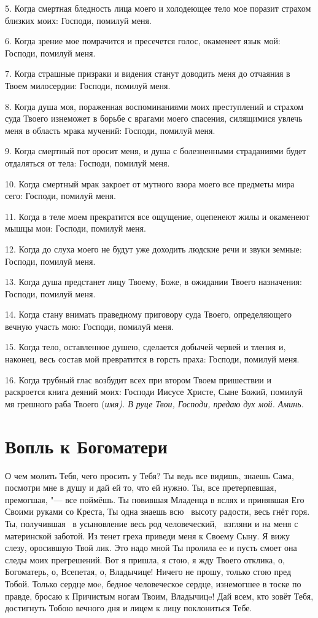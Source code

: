 5. Когда смертная бледность лица моего и холодеющее тело мое поразит страхом близких моих: Господи, помилуй меня. 

6. Когда зрение мое помрачится и пресечется голос, окаменеет язык мой: Господи, помилуй меня. 

7. Когда страшные призраки и видения станут доводить меня до отчаяния в Твоем милосердии: Господи, помилуй меня. 

8. Когда душа моя, пораженная воспоминаниями моих преступлений и страхом суда Твоего изнеможет в борьбе с врагами моего спасения, силящимися увлечь меня в область мрака мучений: Господи, помилуй меня. 

9. Когда смертный пот оросит меня, и душа с болезненными страданиями будет отдаляться от тела: Господи, помилуй меня. 

10. Когда смертный мрак закроет от мутного взора моего все предметы мира сего: Господи, помилуй меня. 

11. Когда в теле моем прекратится все ощущение, оцепенеют жилы и окаменеют мышцы мои: Господи, помилуй меня. 

12. Когда до слуха моего не будут уже доходить людские речи и звуки земные: Господи, помилуй меня. 

13. Когда душа предстанет лицу Твоему, Боже, в ожидании Твоего назначения: Господи, помилуй меня. 

14. Когда стану внимать праведному приговору суда Твоего, определяющего вечную участь мою: Господи, помилуй меня. 

15. Когда тело, оставленное душею, сделается добычей червей и тления и, наконец, весь состав мой превратится в горсть праха: Господи, помилуй меня. 

16. Когда трубный глас возбудит всех при втором Твоем пришествии и раскроется книга деяний моих: Господи Иисусе Христе, Сыне Божий, помилуй мя грешного раба Твоего (\itshape имя\normalfont{}). В руце Твои, Господи, предаю дух мой. Аминь. 





\section{Вопль к Богоматери}
 


О чем молить Тебя, чего просить у Тебя? Ты ведь все видишь, знаешь Сама, посмотри мне в душу и дай ей то, что ей нужно. Ты, все претерпевшая, премогшая, "--- все поймёшь. Ты повившая Младенца в яслях и принявшая Его Своими руками со Креста, Ты одна знаешь всю  высоту радости, весь гнёт горя. Ты, получившая  в усыновление весь род человеческий,  взгляни и на меня с материнской заботой. Из тенет греха приведи меня к Своему Сыну. Я вижу слезу, оросившую Твой лик. Это надо мной Ты пролила еe и пусть смоет она следы моих прегрешений. Вот я пришла, я стою, я жду Твоего отклика, о, Богоматерь, о, Всепетая, о, Владычице! Ничего не прошу, только стою пред Тобой. Только сердце моe, бедное человеческое сердце, изнемогшее в тоске по правде, бросаю к Причистым ногам Твоим, Владычицe! Дай всем, кто зовёт Тебя, достигнуть Тобою вечного дня и лицем к лицу поклониться Тебе.


